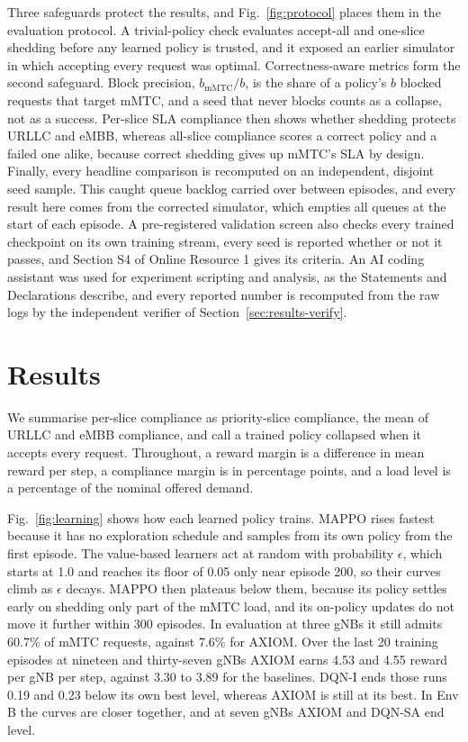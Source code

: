 \documentclass[pdflatex,sn-basic,Numbered]{sn-jnl}
\begin{document}
Three safeguards protect the results, and Fig.~\ref{fig:protocol} places them in the evaluation protocol. A trivial-policy check evaluates accept-all and one-slice shedding before any learned policy is trusted, and it exposed an earlier simulator in which accepting every request was optimal. Correctness-aware metrics form the second safeguard. Block precision, $b_{\text{mMTC}}/b$, is the share of a policy's $b$ blocked requests that target mMTC, and a seed that never blocks counts as a collapse, not as a success. Per-slice SLA compliance then shows whether shedding protects URLLC and eMBB, whereas all-slice compliance scores a correct policy and a failed one alike, because correct shedding gives up mMTC's SLA by design. Finally, every headline comparison is recomputed on an independent, disjoint seed sample. This caught queue backlog carried over between episodes, and every result here comes from the corrected simulator, which empties all queues at the start of each episode. A pre-registered validation screen also checks every trained checkpoint on its own training stream, every seed is reported whether or not it passes, and Section S4 of Online Resource 1 gives its criteria. An AI coding assistant was used for experiment scripting and analysis, as the Statements and Declarations describe, and every reported number is recomputed from the raw logs by the independent verifier of Section~\ref{sec:results-verify}.

\section{Results}
\label{sec:results}
We summarise per-slice compliance as priority-slice compliance, the mean of URLLC and eMBB compliance, and call a trained policy collapsed when it accepts every request. Throughout, a reward margin is a difference in mean reward per step, a compliance margin is in percentage points, and a load level is a percentage of the nominal offered demand.

Fig.~\ref{fig:learning} shows how each learned policy trains. MAPPO rises fastest because it has no exploration schedule and samples from its own policy from the first episode. The value-based learners act at random with probability $\epsilon$, which starts at 1.0 and reaches its floor of 0.05 only near episode 200, so their curves climb as $\epsilon$ decays. MAPPO then plateaus below them, because its policy settles early on shedding only part of the mMTC load, and its on-policy updates do not move it further within 300 episodes. In evaluation at three gNBs it still admits 60.7\% of mMTC requests, against 7.6\% for AXIOM. Over the last 20 training episodes at nineteen and thirty-seven gNBs AXIOM earns 4.53 and 4.55 reward per gNB per step, against 3.30 to 3.89 for the baselines. DQN-I ends those runs 0.19 and 0.23 below its own best level, whereas AXIOM is still at its best. In Env B the curves are closer together, and at seven gNBs AXIOM and DQN-SA end level.
\end{document}
